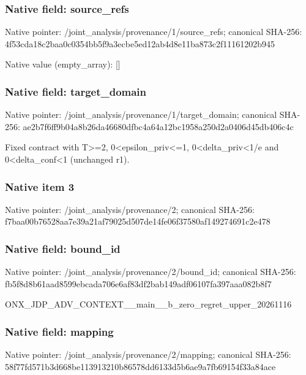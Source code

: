 \documentclass[10pt,a4paper]{article}
\begin{document}
\subsubsection{Native field: source\_\allowbreak{}refs}
Native pointer: /joint\_\allowbreak{}analysis/provenance/1/source\_\allowbreak{}refs; canonical SHA-256: 4f53cda18c2baa0c0354bb5f9a3ecbe5ed12ab4d8e11ba873c2f11161202b945

Native value (empty\_\allowbreak{}array): []

\subsubsection{Native field: target\_\allowbreak{}domain}
Native pointer: /joint\_\allowbreak{}analysis/provenance/1/target\_\allowbreak{}domain; canonical SHA-256: ae2b7f6ff9b04a8b26da46680dfbc4a64a12bc1958a250d2a0406d45db406c4c

\begingroup\raggedright\sloppy Fixed contract with T>=\allowbreak{}2,\allowbreak{} 0<epsilon\_\allowbreak{}priv<=\allowbreak{}1,\allowbreak{} 0<delta\_\allowbreak{}priv<1/\allowbreak{}e and 0<delta\_\allowbreak{}conf<1 (unchanged r1).\par\endgroup

\subsubsection{Native item 3}
Native pointer: /joint\_\allowbreak{}analysis/provenance/2; canonical SHA-256: f7baa00b76528aa7e39a21af79025d507de14fe06f37580af149274691c2e478

\subsubsection{Native field: bound\_\allowbreak{}id}
Native pointer: /joint\_\allowbreak{}analysis/provenance/2/bound\_\allowbreak{}id; canonical SHA-256: fb5f8d8b61aad8599ebcada706e6af83df2bab149adf06107fa397aaa082b8f7

\begingroup\raggedright\sloppy ONX\_\allowbreak{}JDP\_\allowbreak{}ADV\_\allowbreak{}CONTEXT\_\allowbreak{}\_\allowbreak{}main\_\allowbreak{}\_\allowbreak{}b\_\allowbreak{}zero\_\allowbreak{}regret\_\allowbreak{}upper\_\allowbreak{}20261116\par\endgroup

\subsubsection{Native field: mapping}
Native pointer: /joint\_\allowbreak{}analysis/provenance/2/mapping; canonical SHA-256: 58f77fd571b3d668be113913210b86578dd6133d5b6ae9a7fb69154f33a84ace
\end{document}
